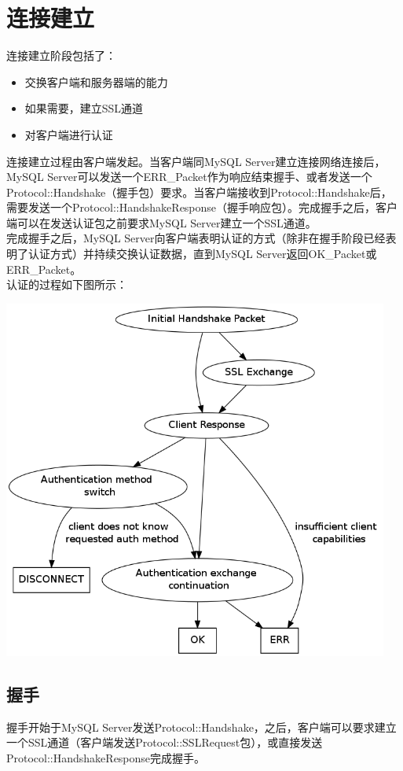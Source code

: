 \documentclass[a4paper, titlepage, 10pt, bookmark]{article}
\begin{document}
\section{连接建立}
连接建立阶段包括了：
\begin{itemize}
    \item 交换客户端和服务器端的能力
    \item 如果需要，建立SSL通道
    \item 对客户端进行认证
\end{itemize}

连接建立过程由客户端发起。当客户端同MySQL Server建立连接网络连接后，MySQL Server可以发送一个ERR\_Packet作为响应结束握手、或者发送一个Protocol::Handshake（握手包）要求。当客户端接收到Protocol::Handshake后，需要发送一个Protocol::HandshakeResponse（握手响应包）。完成握手之后，客户端可以在发送认证包之前要求MySQL Server建立一个SSL通道。\\

完成握手之后，MySQL Server向客户端表明认证的方式（除非在握手阶段已经表明了认证方式）并持续交换认证数据，直到MySQL Server返回OK\_Packet或ERR\_Packet。\\

认证的过程如下图所示：
\begin{center}
\includegraphics[width=5in]{002.png}
\end{center}

\subsection{握手}
握手开始于MySQL Server发送Protocol::Handshake，之后，客户端可以要求建立一个SSL通道（客户端发送Protocol::SSLRequest包），或直接发送Protocol::HandshakeResponse完成握手。
\end{document}
